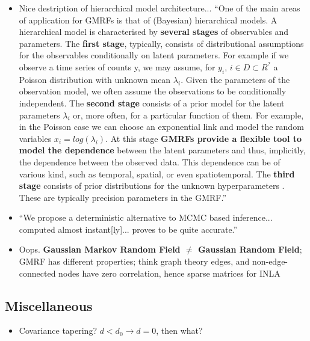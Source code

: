 \documentclass{article}
\begin{document}
\begin{itemize}
\item Nice destription of hierarchical model architecture... ``One of the main areas of application for GMRFs is that of (Bayesian) hierarchical models. A hierarchical model is characterised by {\bf several stages} of observables and parameters. The {\bf first stage}, typically, consists of distributional assumptions for the observables conditionally on latent parameters. For example if we observe a time series of counts y, we may assume, for $y_{i}$, $i \in D \subset R^{?}$ a Poisson distribution with unknown mean  $\lambda_{i}$. Given the parameters of the observation model, we often assume the observations to be conditionally independent. The {\bf second stage} consists of a prior model for the latent parameters $\lambda_{i}$ or, more often, for a particular function of them. For example, in the Poisson case we can choose an exponential link and model the random variables $x_{i} = log(\lambda_{i})$. At this stage {\bf GMRFs provide a flexible tool to model the dependence} between the latent parameters and thus, implicitly, the dependence between the observed data. This dependence can be of various kind, such as temporal, spatial, or even spatiotemporal. The {\bf third stage} consists of prior distributions for the unknown hyperparameters  . These are typically precision parameters in the GMRF.''
\item ``We propose a deterministic alternative to MCMC based inference... computed almost instant[ly]... proves to be quite accurate.''
\item Oops. {\bf Gaussian Markov Random Field $\neq$ Gaussian Random Field}; \\
GMRF has different properties; think graph theory edges, and non-edge-connected nodes have zero correlation, hence sparse matrices for INLA
\end{itemize}

\subsection*{Miscellaneous}
\begin{itemize}
\item Covariance tapering? $d < d_{0} \rightarrow d = 0$, then what?
\end{itemize}
\end{document}
